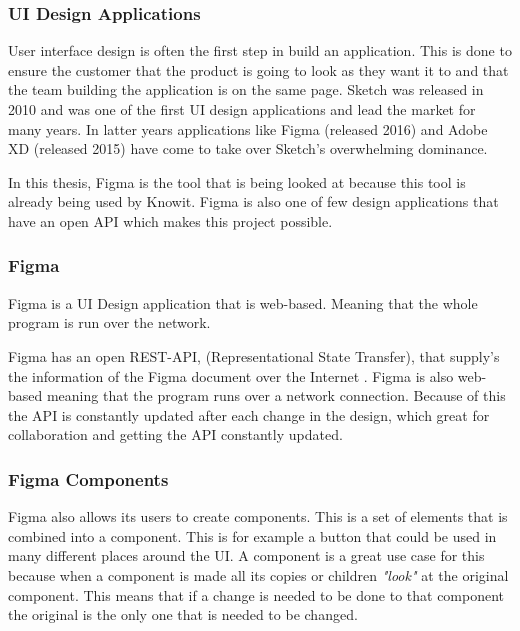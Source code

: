 \subsubsection{UI Design Applications}%
\label{ssub:Apps}
User interface design is often the first step in build an application. This is done to ensure the customer that the product is going to look as they want it to and that the team building the application is on the same page. Sketch \cite{sketchDigitalDesignToolkit} was released in 2010 and was one of the first UI design applications and lead the market for many years. In latter years applications like Figma \cite{figmaFigmaCollaborativeInterface} (released 2016) and Adobe XD \cite{adobeAdobeXDFast}(released 2015) have come to take over Sketch's overwhelming dominance. 

In this thesis, Figma is the tool that is being looked at because this tool is already being used by Knowit. Figma is also one of few design applications that have an open API which makes this project possible. 

 






\subsubsection{Figma}%
\label{sub:Figma}
Figma is a UI Design application that is web-based. Meaning that the whole program is run over the network. 

Figma has an open REST-API, (Representational State Transfer), that supply's the information of the Figma document over the Internet \cite{figmaFigma, RepresentationalStateTransfer2021}. Figma is also web-based meaning that the program runs over a network connection. Because of this the API is constantly updated after each change in the design, which great for collaboration and getting the API constantly updated.

\subsubsection{Figma Components}%
\label{ssub:Figma Components}

Figma also allows its users to create components. This is a set of elements that is combined into a component. This is for example a button that could be used in many different places around the UI. A component is a great use case for this because when a component is made all its copies or children \textit{"look"} at the original component. This means that if a change is needed to be done to that component the original is the only one that is needed to be changed.

